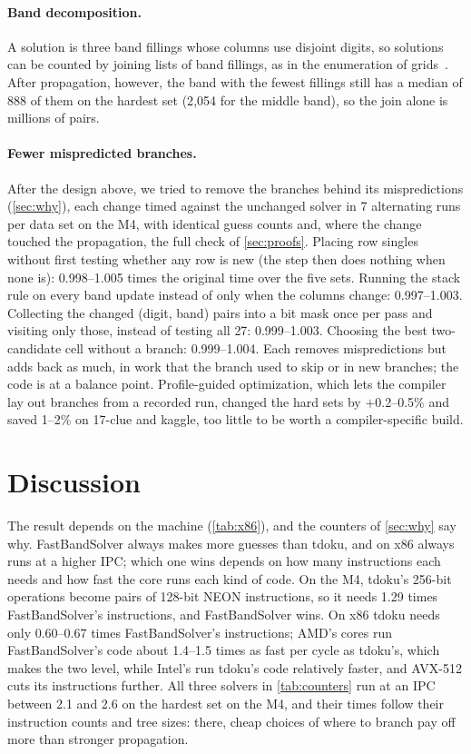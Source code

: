 \documentclass[11pt]{article}
\theoremstyle{definition}
\theoremstyle{plain}
\begin{document}
\paragraph{Band decomposition.} A solution is three band fillings whose columns use disjoint digits, so solutions can
be counted by joining lists of band fillings, as in the enumeration of grids~\cite{felgenhauer2006mathematics}. After
propagation, however, the band with the fewest fillings still has a median of 888 of them on the hardest set (2{,}054
for the middle band), so the join alone is millions of pairs.

\paragraph{Fewer mispredicted branches.} After the design above, we tried to remove the branches behind its
mispredictions (\cref{sec:why}), each change timed against the unchanged solver in 7 alternating runs per data set on
the M4, with identical guess counts and, where the change touched the propagation, the full check of
\cref{sec:proofs}. Placing row singles without first testing whether any row is new (the step then does nothing when
none is): 0.998--1.005 times the original time over the five sets. Running the stack rule on every band update instead
of only when the columns change: 0.997--1.003. Collecting the changed (digit, band) pairs into a bit mask once per pass
and visiting only those, instead of testing all 27: 0.999--1.003. Choosing the best two-candidate cell without a
branch: 0.999--1.004. Each removes mispredictions but adds back as much, in work that the branch used to skip or in new
branches; the code is at a balance point. Profile-guided optimization, which lets the compiler lay out branches from a
recorded run, changed the hard sets by $+$0.2--0.5\% and saved 1--2\% on 17-clue and kaggle, too little to be
worth a compiler-specific build.

\section{Discussion}

The result depends on the machine (\cref{tab:x86}), and the counters of \cref{sec:why} say why. FastBandSolver
always makes more guesses than tdoku, and on x86 always runs at a higher IPC; which one wins depends on how many
instructions each needs and how fast the core runs each kind of code. On the M4, tdoku's 256-bit operations become
pairs of 128-bit NEON instructions, so it needs 1.29 times FastBandSolver's instructions, and FastBandSolver wins. On
x86 tdoku needs only 0.60--0.67 times FastBandSolver's instructions; AMD's cores run FastBandSolver's code about 1.4--1.5
times as fast per cycle as tdoku's, which makes the two level, while Intel's run tdoku's code relatively faster, and
AVX-512 cuts its instructions further. All three solvers in \cref{tab:counters} run at an IPC between 2.1 and 2.6 on
the hardest set on the M4, and their times follow their instruction counts and tree sizes: there, cheap choices of where to branch pay
off more than stronger propagation.
\end{document}
